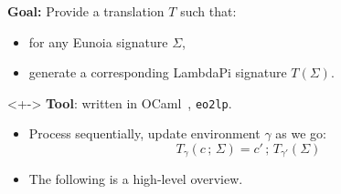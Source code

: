 \documentclass[handout, lualatex, compress, 12pt-------------------------------------------------------------------------------------------------------------]{beamer}
\begin{document}
\begin{frame}
	\textbf{Goal:}
	Provide a translation $T$ such that:
	\begin{itemize}
		\item[\emoji{green-heart}] for any Eunoia signature $Σ$,
		\item[\emoji{purple-heart}] generate a corresponding LambdaPi signature $T(Σ)$.
	\end{itemize}

	\begin{uncoverenv}<+->
		\textbf{Tool}: written in OCaml~, \texttt{eo2lp}.
		\begin{itemize}
			\item<+-> Process sequentially,
			      update environment $γ$ as we go:
			      $$T_{γ}(c\,{;}\,Σ) = c'\,{;}\,T_{γ'}(Σ)$$

			\item<+-> The following is a high-level overview.
		\end{itemize}
	\end{uncoverenv}
\end{frame}

\end{document}
